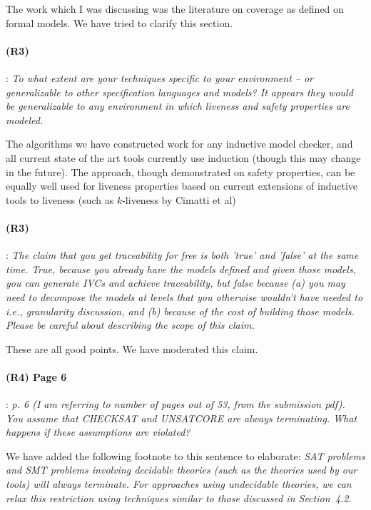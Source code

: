\documentclass{article}
\begin{document}
The work which I was discussing was the literature on coverage as defined on formal models.  We have tried to clarify this section. 

\paragraph{(R3)}: \textit{To what extent are your techniques specific to your environment -- or generalizable to other specification languages and models? It appears they would be generalizable to any environment in which liveness and safety properties are modeled.}
\vspace{0.05in}

The algorithms we have constructed work for any inductive model checker, and all current state of the art tools currently use induction (though this may change in the future).  The approach, though demonstrated on safety properties, can be equally well used for liveness properties based on current extensions of inductive tools to liveness (such as $k$-liveness by Cimatti et al)

\paragraph{(R3)}: \textit{The claim that you get traceability for free is both 'true' and 'false' at the same time. True, because you already have the models defined and given those models, you can generate IVCs and achieve traceability, but false because   (a) you may need to decompose the models at levels that you otherwise wouldn't have needed to i.e., granularity discussion, and  (b) because of the cost of building those models.   Please be careful about describing the scope of this claim.}
\vspace{0.05in}

These are all good points.  We have moderated this claim.  

\paragraph{(R4) Page 6}: \textit{p. 6 (I am referring to number of pages out of 53, from the submission pdf). You assume that CHECKSAT and UNSATCORE are
always terminating. What happens if these assumptions are violated?}
\vspace{0.05in}

\noindent We have added the following footnote to this sentence to elaborate: \textit{SAT problems and SMT problems involving decidable theories (such as the theories used by our tools) will always terminate.  For approaches using undecidable theories, we can relax this restriction using  techniques similar to those discussed in Section~4.2}.
\end{document}
